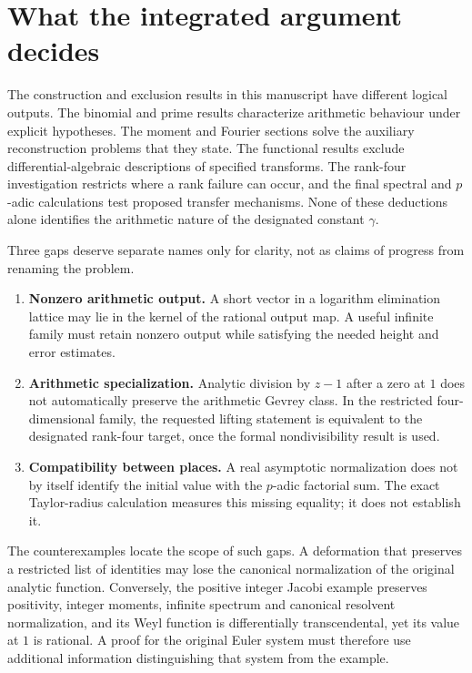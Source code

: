 \documentclass[11pt,a4paper]{article}
\theoremstyle{definition}
\theoremstyle{remark}
\theoremstyle{plain}
\numberwithin{equation}{section}
\begin{document}

\clearpage
\section{What the integrated argument decides}
\label{int:endpoint}

The construction and exclusion results in this manuscript have different
logical outputs. The binomial and prime results characterize arithmetic
behaviour under explicit hypotheses. The moment and Fourier sections
solve the auxiliary reconstruction problems that they state. The
functional results exclude differential-algebraic descriptions of
specified transforms. The rank-four investigation restricts where a
rank failure can occur, and the final spectral and $p$-adic calculations
test proposed transfer mechanisms. None of these deductions alone
identifies the arithmetic nature of the designated constant $\gamma$.

Three gaps deserve separate names only for clarity, not as claims of
progress from renaming the problem.
\begin{enumerate}[leftmargin=*,itemsep=5pt]
\item \textbf{Nonzero arithmetic output.} A short vector in a logarithm
elimination lattice may lie in the kernel of the rational output map.
A useful infinite family must retain nonzero output while satisfying
the needed height and error estimates.
\item \textbf{Arithmetic specialization.} Analytic division by $z-1$
after a zero at $1$ does not automatically preserve the arithmetic
Gevrey class. In the restricted four-dimensional family, the requested
lifting statement is equivalent to the designated rank-four target,
once the formal nondivisibility result is used.
\item \textbf{Compatibility between places.} A real asymptotic
normalization does not by itself identify the initial value with the
$p$-adic factorial sum. The exact Taylor-radius calculation measures this
missing equality; it does not establish it.
\end{enumerate}

The counterexamples locate the scope of such gaps. A deformation that
preserves a restricted list of identities may lose the canonical
normalization of the original analytic function. Conversely, the
positive integer Jacobi example preserves positivity, integer moments,
infinite spectrum and canonical resolvent normalization, and its Weyl
function is differentially transcendental, yet its value at $1$ is
rational. A proof for the original Euler system must therefore use
additional information distinguishing that system from the example.
\end{document}
